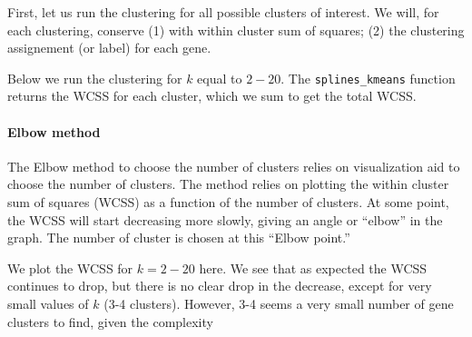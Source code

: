 \documentclass[9pt,a4paper,]{extarticle}
\newenvironment{Shaded}{\begin{snugshade}}{\end{snugshade}}
\newcommand{\ControlFlowTok}[1]{\textcolor[rgb]{0.13,0.29,0.53}{\textbf{#1}}}
\newcommand{\DataTypeTok}[1]{\textcolor[rgb]{0.13,0.29,0.53}{#1}}
\newcommand{\DecValTok}[1]{\textcolor[rgb]{0.00,0.00,0.81}{#1}}
\newcommand{\KeywordTok}[1]{\textcolor[rgb]{0.13,0.29,0.53}{\textbf{#1}}}
\newcommand{\NormalTok}[1]{#1}
\newcommand{\OperatorTok}[1]{\textcolor[rgb]{0.81,0.36,0.00}{\textbf{#1}}}
\newcommand{\StringTok}[1]{\textcolor[rgb]{0.31,0.60,0.02}{#1}}
\begin{document}
First, let us run the clustering for all possible clusters of interest. We
will, for each clustering, conserve (1) with within cluster sum of
squares; (2) the clustering assignement (or label) for each gene.

Below we run the clustering for \(k\) equal to \(2-20\). The \texttt{splines\_kmeans}
function returns the WCSS for each cluster, which we sum to get the total
WCSS.

\begin{Shaded}
\end{Shaded}

\hypertarget{elbow-method}{%
\paragraph{Elbow method}\label{elbow-method}}

The Elbow method to choose the number of clusters relies on visualization aid
to choose the number of clusters. The method relies on plotting the within
cluster sum of squares (WCSS) as a function of the number of clusters. At some
point, the WCSS will start decreasing more slowly, giving an angle or ``elbow''
in the graph. The number of cluster is chosen at this ``Elbow point.''

We plot the WCSS for \(k=2-20\) here. We see that as expected the WCSS continues
to drop, but there is no clear drop in the decrease, except for very small
values of \(k\) (3-4 clusters). However, 3-4 seems a very small number of gene
clusters to find, given the complexity
\end{document}

